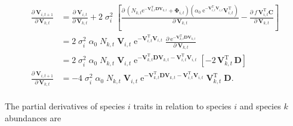 \begin{equation*}
\begin{split}
    \frac{ \partial \: \mathbf{V}_{i,t+1} }{ \partial \: \mathbf{V}_{k,t} } &=
        \frac{ \partial \: \mathbf{V}_{i,t} }{ \partial \: \mathbf{V}_{k,t} } +
        2 \; \sigma_i^2 \;
        \left[
            \frac{ \partial \:
                \left(
                    N_{k,t} \textrm{e}^{- \mathbf{V}_{k,t}^{\textrm{T}} \mathbf{D}
                    \mathbf{V}_{k,t}} + \mathbf{\Phi}_{i,t}
                \right)
                \left(
                    \alpha_0 \; \textrm{e}^{ - \mathbf{V}_{i,t}^{\textrm{T}}
                    \mathbf{V}_{i,t} } \mathbf{V}_{i,t}^{\textrm{T}}
                \right)
            }{ \partial \:  \mathbf{V}_{k,t} } -
            \frac{ \partial \:  f \, \mathbf{V}_{i,t}^{\textrm{T}} \mathbf{C} }{
            \partial \: \mathbf{V}_{k,t} }
        \right] \\
    &= 2 \; \sigma_i^2 \; \alpha_0 \; N_{k,t} \; \mathbf{V}_{i,t} \;
        \textrm{e}^{ - \mathbf{V}_{i,t}^{\textrm{T}}
        \mathbf{V}_{i,t} } \; 
        \frac{ \partial \:
                \textrm{e}^{
                    - \mathbf{V}_{k,t}^{\textrm{T}} \mathbf{D} \mathbf{V}_{k,t}
                    }
            }{ \partial \:  \mathbf{V}_{k,t} } \\
    &= 2 \; \sigma_i^2 \; \alpha_0 \; N_{k,t} \; \mathbf{V}_{i,t} \;
        \textrm{e}^{
                    - \mathbf{V}_{k,t}^{\textrm{T}} \mathbf{D} \mathbf{V}_{k,t}
                    - \mathbf{V}_{i,t}^{\textrm{T}} \mathbf{V}_{i,t}
                } \;
        \left[ 
            - 2 \, \mathbf{V}_{k,t}^{\textrm{T}} \, \mathbf{D}
        \right] \\
    \frac{ \partial \: \mathbf{V}_{i,t+1} }{ \partial \: \mathbf{V}_{k,t}} &=
        -4 \; \sigma_i^2 \; \alpha_0 \; N_{k,t} \; \mathbf{V}_{i,t} \;
        \textrm{e}^{
                    - \mathbf{V}_{k,t}^{\textrm{T}} \mathbf{D} \mathbf{V}_{k,t}
                    - \mathbf{V}_{i,t}^{\textrm{T}} \mathbf{V}_{i,t}
                } \;
        \mathbf{V}_{k,t}^{\textrm{T}} \; \mathbf{D}
    \textrm{.} \\
\end{split}
\end{equation*}

The partial derivatives of species $i$ traits in relation to species $i$ 
and species $k$ abundances are

